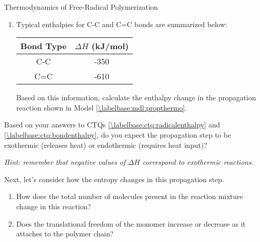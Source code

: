 \begin{activity}{Thermodynamics of Free-Radical Polymerization}
\begin{ctqs}
\begin{enumerate}
				\begin{solution}[1in]
				\end{solution}
			
			\item Typical enthalpies for C-C and C=C bonds are summarized below:
				
				\begin{center}
					\renewcommand{\arraystretch}{1.5}
					\begin{tabular}{c c}
						\hline
						Bond Type & $\Delta H$ (kJ/mol) \\\hline
						C-C	&	-350 \\
						C=C &	-610 \\\hline
					\end{tabular}
				\end{center}
				
				Based on this information, calculate the enthalpy change in the propagation reaction shown in Model \ref{\labelbase:mdl:propthermo}.
				
				\begin{solution}[1.25in]
				\end{solution}
		\end{enumerate}
		
	\question Based on your answers to CTQs \ref{\labelbase:ctq:radicalenthalpy} and \ref{\labelbase:ctq:bondenthalpy}, do you expect the propagation step to be exothermic (releases heat) or endothermic (requires heat input)?
	
		\emph{Hint: remember that negative values of $\Delta H$ correspond to exothermic reactions.}
				
				\begin{solution}[0.75in]
				\end{solution}
		
	\question Next, let's consider how the entropy changes in this propagation step.
	
		\begin{enumerate}
			
			\item How does the total number of molecules present in the reaction mixture change in this reaction?
				
				\begin{solution}[0.5in]
				\end{solution}
			
			\item Does the translational freedom of the monomer increase or decrease as it attaches to the polymer chain?
				

\end{enumerate}
\end{ctqs}
\end{activity}
